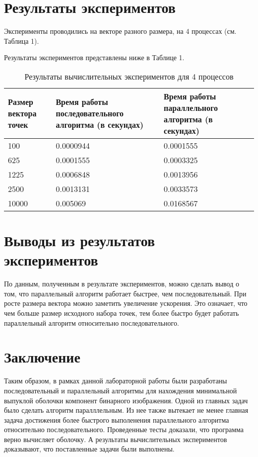 \documentclass{report}
\begin{document}
\section*{Результаты экспериментов}

\par Эксперименты проводились на векторе разного размера, на 4 процессах (см. Таблица 1).

\par Результаты экспериментов представлены ниже в Таблице 1.

\begin{table}[!h]

\centering
\begin{tabular}{| p{2cm} | p{3cm} | p{4cm} |}
\hline
Размер вектора точек & Время работы последовательного алгоритма (в секундах) & Время работы параллельного алгоритма (в секундах)\\[5pt]
\hline
100       &  0.0000944  &  0.0001555    \\
625       &  0.0001555  &  0.0003325   \\
1225      &  0.0006848  &  0.0013956   \\
2500      &  0.0013131  &  0.0033573  \\
10000     &  0.005069   &  0.0168567    \\
\hline
\end{tabular}
\caption{Результаты вычислительных экспериментов для 4 процессов}
\end{table}


\newpage

\section*{Выводы из результатов экспериментов}
По данным, полученным в результате экспериментов, можно сделать вывод о том, что параллельный алгоритм работает быстрее, чем последовательный. При росте размера вектора можно заметить увеличение ускорения. Это означает, что чем больше размер исходного набора точек, тем более быстро будет работать параллельный алгоритм относительно последовательного. 

\newpage

\section*{Заключение}
Таким образом, в рамках данной лабораторной работы были разработаны последовательный и параллельный алгоритмы для нахождения минимальной выпуклой оболочки компонент бинарного изображения. Одной из главных задач было сделать алгоритм паралллельным. Из нее также вытекает не менее главная задача достижения более быстрого выполенения параллельного алгоритма относительно последовательного. Проведенные тесты доказали, что программа верно вычисляет оболочку. А результаты вычислительных экспериментов доказывают, что поставленные задачи были выполнены.
\newpage
\end{document}
